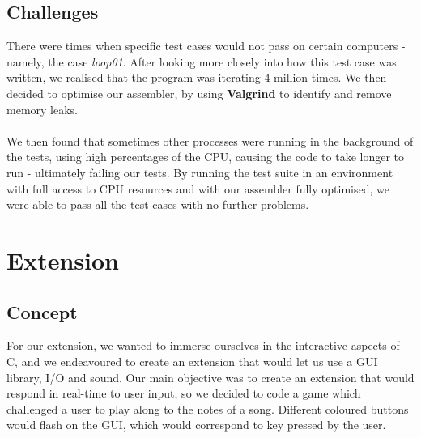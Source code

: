 \documentclass[11pt]{article}
\begin{document}
\subsection{Challenges}

There were times when specific test cases would not pass on certain computers - namely, the case \emph{loop01}. After looking more closely into how this test case was written, we realised that the program was iterating 4 million times. We then decided to optimise our assembler, by using \textbf{Valgrind} to identify and remove memory leaks. \\\\ We then found that sometimes other processes were running in the background of the tests, using high percentages of the CPU, causing the code to take longer to run - ultimately failing our tests. By running the test suite in an environment with full access to CPU resources and with our assembler fully optimised, we were able to pass all the test cases with no further problems.

\section{Extension}

\subsection{Concept}

For our extension, we wanted to immerse ourselves in the interactive aspects of C, and we endeavoured to create an extension that would let us use a GUI library, I/O and sound. Our main objective was to create an extension that would respond in real-time to user input, so we decided to code a game which challenged a user to play along to the notes of a song. Different coloured buttons would flash on the GUI, which would correspond to key pressed by the user.

\newpage
\end{document}

